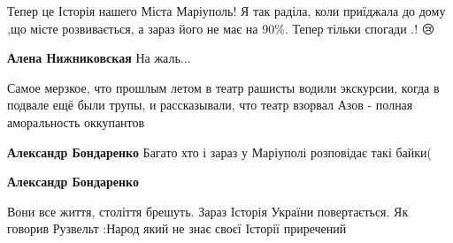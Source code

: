  
 
 
 
 

\qqSecCmt


Тепер це Історія нашего Міста Маріуполь! Я так раділа, коли приїджала до дому
,що місте розвивається, а зараз його не має на 90\%. Тепер тільки спогади .!
😢💛💙💔

\begin{itemize} %
\textbf{Алена Нижниковская} На жаль...
\end{itemize} %


Самое мерзкое, что прошлым летом в театр рашисты водили экскурсии, когда в
подвале ещё были трупы, и рассказывали, что театр взорвал Азов - полная
аморальность оккупантов

\begin{itemize} %
\textbf{Александр Бондаренко} Багато хто і зараз у Маріуполі розповідає такі байки(

\textbf{Александр Бондаренко} 

Вони все життя, століття брешуть. Зараз Історія України повертається. Як
говорив Рузвельт :Народ який не знає своєї Історії приречений

\end{itemize} %
